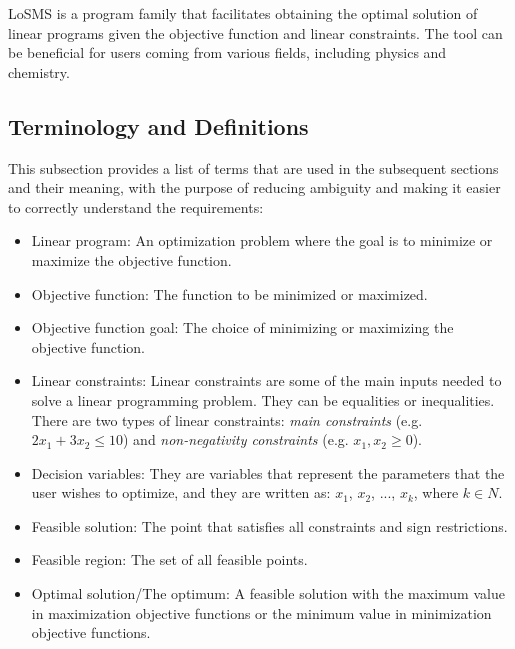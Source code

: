 \documentclass[12pt]{article}
\newcommand{\famname}{LoSMS} %
\begin{document}
\famname{} is a program family that facilitates obtaining the optimal solution 
of linear programs given the objective function and linear constraints. The 
tool can be beneficial for users coming from various fields, including physics 
and chemistry.

\subsection{Terminology and  Definitions}

This subsection provides a list of terms that are used in the subsequent
sections and their meaning, with the purpose of reducing ambiguity and making it
easier to correctly understand the requirements:

\begin{itemize}
	\item Linear program: An optimization problem where the goal is to minimize 
	or maximize the objective function.
	
	\item Objective function: The function to be minimized or maximized.
	
	\item Objective function goal: The choice of minimizing or maximizing the 
	objective function.
	
	\item Linear constraints: Linear constraints are some of the main inputs 
	needed to solve a linear programming problem. They can be equalities or 
	inequalities. There are two types of linear constraints: \textit{main 
	constraints} (e.g. $2x_1 + 3x_2 \leq 10$) and \textit{non-negativity 
	constraints} (e.g. $x_1, x_2 \geq 0$).
	
	\item Decision variables: They are variables that represent the parameters 
	that the user wishes to optimize, and they are written as: ${x_1}$, 
	${x_2}$, ..., ${x_k}$, where $k \in N$.
	
	\item Feasible solution: The point that satisfies all constraints and sign 
	restrictions.
	
	\item Feasible region: The set of all feasible points.
	
	\item Optimal solution/The optimum: A feasible solution with the maximum 
	value in maximization objective functions or the minimum value in 
	minimization objective functions.
\end{itemize}
\end{document}
